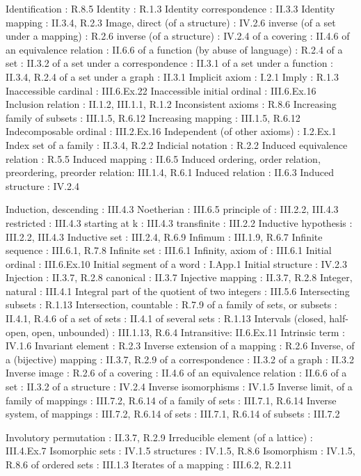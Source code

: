 Identification : R.8.5 Identity : R.1.3 Identity correspondence : II.3.3 Identity mapping : II.3.4, R.2.3 Image, direct (of a structure) : IV.2.6 inverse (of a set under a mapping) : R.2.6 inverse (of a structure) : IV.2.4 of a covering : II.4.6 of an equivalence relation : II.6.6 of a function (by abuse of language) : R.2.4 of a set : II.3.2 of a set under a correspondence : II.3.1 of a set under a function : II.3.4, R.2.4 of a set under a graph : II.3.1 Implicit axiom : I.2.1 Imply : R.1.3 Inaccessible cardinal : III.6.Ex.22 Inaccessible initial ordinal : III.6.Ex.16 Inclusion relation : II.1.2, III.1.1, R.1.2 Inconsistent axioms : R.8.6 Increasing family of subsets : III.1.5, R.6.12 Increasing mapping : III.1.5, R.6.12 Indecomposable ordinal : III.2.Ex.16 Independent (of other axioms) : I.2.Ex.1 Index set of a family : II.3.4, R.2.2 Indicial notation : R.2.2 Induced equivalence relation : R.5.5 Induced mapping : II.6.5 Induced ordering, order relation, preordering, preorder relation: III.1.4, R.6.1 Induced relation : II.6.3 Induced structure : IV.2.4

Induction, descending : III.4.3 Noetherian : III.6.5 principle of : III.2.2, III.4.3 restricted : III.4.3 starting at k : III.4.3 transfinite : III.2.2 Inductive hypothesis : III.2.2, III.4.3 Inductive set : III.2.4, R.6.9 Infimum : III.1.9, R.6.7 Infinite sequence : III.6.1, R.7.8 Infinite set : III.6.1 Infinity, axiom of : III.6.1 Initial ordinal : III.6.Ex.10 Initial segment of a word : I.App.1 Initial structure : IV.2.3 Injection : II.3.7, R.2.8 canonical : II.3.7 Injective mapping : II.3.7, R.2.8 Integer, natural : III.4.1 Integral part of the quotient of two integers : III.5.6 Intersecting subsets : R.1.13 Intersection, countable : R.7.9 of a family of sets, or subsets : II.4.1, R.4.6 of a set of sets : II.4.1 of several sets : R.1.13 Intervals (closed, half-open, open, unbounded) : III.1.13, R.6.4 Intransitive: II.6.Ex.11 Intrinsic term : IV.1.6 Invariant element : R.2.3 Inverse extension of a mapping : R.2.6 Inverse, of a (bijective) mapping : II.3.7, R.2.9 of a correspondence : II.3.2 of a graph : II.3.2 Inverse image : R.2.6 of a covering : II.4.6 of an equivalence relation : II.6.6 of a set : II.3.2 of a structure : IV.2.4 Inverse isomorphisms : IV.1.5 Inverse limit, of a family of mappings : III.7.2, R.6.14 of a family of sets : III.7.1, R.6.14 Inverse system, of mappings : III.7.2, R.6.14 of sets : III.7.1, R.6.14 of subsets : III.7.2

Involutory permutation : II.3.7, R.2.9 Irreducible element (of a lattice) : III.4.Ex.7 Isomorphic sets : IV.1.5 structures : IV.1.5, R.8.6 Isomorphism : IV.1.5, R.8.6 of ordered sets : III.1.3 Iterates of a mapping : III.6.2, R.2.11

